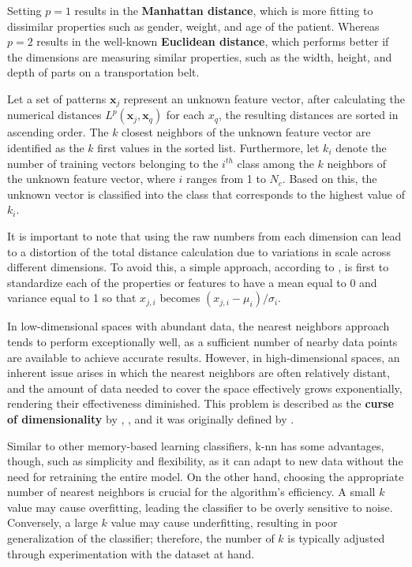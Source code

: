 Setting $p=1$ results in the \textbf{Manhattan distance}, which is more fitting to dissimilar properties such as gender, weight, and age of the patient. Whereas $p=2$ results in the well-known \textbf{Euclidean distance}, which performs better if the dimensions are measuring similar properties, such as the width, height, and depth of parts on a transportation belt.

Let a set of patterns $\mathbf{x}_j$ represent an unknown feature vector, after calculating the numerical distances $L^p\left(\mathbf{x}_j, \mathbf{x}_q\right)$ for each ${x}_q$, the resulting distances are sorted in ascending order. The $k$ closest neighbors of the unknown feature vector are identified as the $k$ first values in the sorted list. Furthermore, let $k_i$ denote the number of training vectors belonging to the $i^{t h}$ class among the $k$ neighbors of the unknown feature vector, where $i$ ranges from 1 to $N_c$. Based on this, the unknown vector is classified into the class that corresponds to the highest value of $k_i$. 

It is important to note that using the raw numbers from each dimension can lead to a distortion of the total distance calculation due to variations in scale across different dimensions. To avoid this, a simple approach, according to \textcite{Hastie2009}, is first to standardize each of the properties or features to have a mean equal to 0 and variance equal to 1 so that $x_{j, i}$ becomes $\left(x_{j, i}-\mu_i\right) / \sigma_i$.

 In low-dimensional spaces with abundant data, the nearest neighbors approach tends to perform exceptionally well, as a sufficient number of nearby data points are available to achieve accurate results. However, in high-dimensional spaces, an inherent issue arises in which the nearest neighbors are often relatively distant, and the amount of data needed to cover the space effectively grows exponentially, rendering their effectiveness diminished. This problem is described as the \textbf{curse of dimensionality} by \textcite{Russel2010}, \textcite{Hastie2009}, and it was originally defined by \textcite{Bellman1961}.

Similar to other memory-based learning classifiers, \gls{k-nn} has some advantages, though, such as simplicity and flexibility, as it can adapt to new data without the need for retraining the entire model. On the other hand, choosing the appropriate number of nearest neighbors is crucial for the algorithm's efficiency. A small $k$ value may cause overfitting, leading the classifier to be overly sensitive to noise. Conversely, a large $k$ value may cause underfitting, resulting in poor generalization of the classifier; therefore, the number of $k$ is typically adjusted through experimentation with the dataset at hand.


